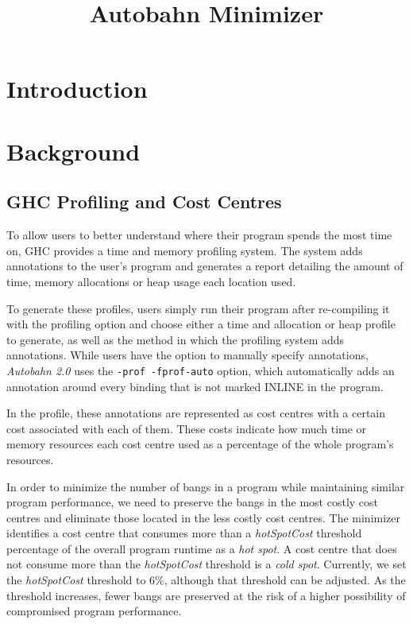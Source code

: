 \documentclass[format=sigplan]{acmart}
\newcommand{\hotspot}[0]{\textit{hot spot}}
\newcommand{\coldspot}[0]{\textit{cold spot}}
\newcommand{\hotspotcost}[0]{\textit{hotSpotCost}}
\newcommand{\At}[0]{\textit{Autobahn 2.0}}
\begin{document}
\title{Autobahn Minimizer}
\maketitle

\begin{abstract}
\end{abstract}

\section{Introduction}
\section{Background}

\subsection{GHC Profiling and Cost Centres}
To allow users to better understand where their program spends 
the most time on, GHC provides a time and memory profiling system. The
system adds annotations to the user's program and generates a report
detailing the amount of time, memory allocations or heap usage each 
location used. 

To generate these profiles, users simply run their program 
after re-compiling it with the profiling option and choose either a time and allocation or heap profile to generate, as well as the method in which the profiling 
system adds annotations. While users have the option to manually specify
annotations, \At{} uses the \texttt{-prof -fprof-auto} option, which
automatically adds an annotation around every binding that is not marked
INLINE in the program.

In the profile, these annotations are represented as cost centres with a 
certain cost associated with each of them. These costs indicate how much
time or memory resources each cost centre used as a percentage of the
whole program's resources. 

In order to minimize the number of bangs in 
a program while maintaining similar program performance, we need to 
preserve the bangs in the most costly cost centres and eliminate those 
located in the less costly cost centres. The minimizer identifies a cost centre that consumes more than a \hotspotcost{} threshold percentage of the overall program runtime as a \hotspot{}. A cost centre that does not consume more than the \hotspotcost{} threshold is a \coldspot{}. Currently, we set the \hotspotcost{} threshold to 6\%, although that threshold can be
adjusted. As the threshold increases, fewer bangs
are preserved at the risk of a higher possibility of compromised program 
performance. 
\end{document}
